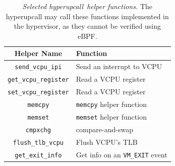 \documentclass[11pt]{article}
\newcommand{\hypercallback}{hyperupcall\xspace{}}
\begin{document}


\begin{table}[t!]
 \centering
 \small
 \begin{tabular}{c|l}
 \textbf{Helper Name} & \textbf{Function} \\
 \hline
 \texttt{send\_vcpu\_ipi} & Send an interrupt to VCPU \\
 \texttt{get\_vcpu\_register} & Read a VCPU register\\
 \texttt{set\_vcpu\_register} & Read a VCPU register\\
 \texttt{memcpy} & \texttt{memcpy} helper function \\
 \texttt{memset} & \texttt{memset} helper function \\
 \texttt{cmpxchg} & compare-and-swap \\
 \texttt{flush\_tlb\_vcpu} & Flush VCPU's TLB \\
 \texttt{get\_exit\_info} &  Get info on an \texttt{VM\_EXIT} event
 \end{tabular}
 \caption{\emph{Selected \hypercallback~helper functions.} The \hypercallback{} may call these functions implemented in the hypervisor, as they cannot be verified using eBPF.}
\label{table:helpers}
 \end{table}
\end{document}
